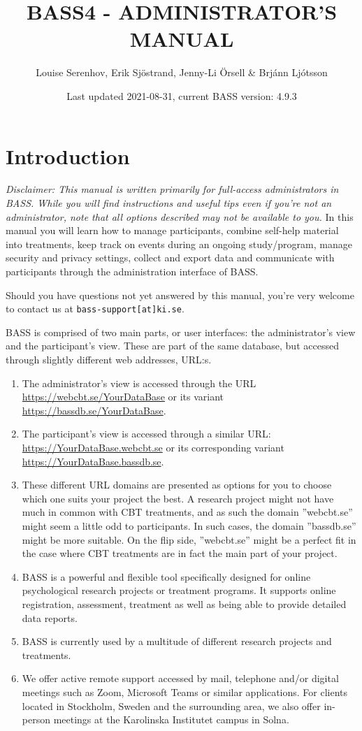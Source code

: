 \documentclass[]{book}
\title{BASS4 - ADMINISTRATOR'S MANUAL}
\author{Louise Serenhov, Erik Sjöstrand, Jenny-Li Örsell \& Brjánn Ljótsson}
\date{Last updated 2021-08-31, current BASS version: 4.9.3}
\providecommand{\tightlist}{%
  \setlength{\itemsep}{0pt}\setlength{\parskip}{0pt}}
\begin{document}
\maketitle

{
\setcounter{tocdepth}{1}
\tableofcontents
}
\hypertarget{introduction}{%
\chapter{Introduction}\label{introduction}}

\emph{Disclaimer: This manual is written primarily for full-access administrators in BASS. While you will find instructions and useful tips even if you're not an administrator, note that all options described may not be available to you.}
In this manual you will learn how to manage participants, combine self-help material into treatments, keep track on events during an ongoing study/program, manage security and privacy settings, collect and export data and communicate with participants through the administration interface of BASS.

Should you have questions not yet answered by this manual, you're very welcome to contact us at \texttt{bass-support{[}at{]}ki.se}.

BASS is comprised of two main parts, or user interfaces: the administrator's view and the participant's view. These are part of the same database, but accessed through slightly different web addresses, URL:s.

\begin{enumerate}
\def\labelenumi{\arabic{enumi}.}
\tightlist
\item
  The administrator's view is accessed through the URL \url{https://webcbt.se/YourDataBase} or its variant \url{https://bassdb.se/YourDataBase}.
\item
  The participant's view is accessed through a similar URL: \url{https://YourDataBase.webcbt.se} or its corresponding variant \url{https://YourDataBase.bassdb.se}.
\item
  These different URL domains are presented as options for you to choose which one suits your project the best. A research project might not have much in common with CBT treatments, and as such the domain ''webcbt.se'' might seem a little odd to participants. In such cases, the domain ''bassdb.se'' might be more suitable. On the flip side, ''webcbt.se'' might be a perfect fit in the case where CBT treatments are in fact the main part of your project.
\item
  BASS is a powerful and flexible tool specifically designed for online psychological research projects or treatment programs. It supports online registration, assessment, treatment as well as being able to provide detailed data reports.
\item
  BASS is currently used by a multitude of different research projects and treatments.
\item
  We offer active remote support accessed by mail, telephone and/or digital meetings such as Zoom, Microsoft Teams or similar applications. For clients located in Stockholm, Sweden and the surrounding area, we also offer in-person meetings at the Karolinska Institutet campus in Solna.
\end{enumerate}
\end{document}
